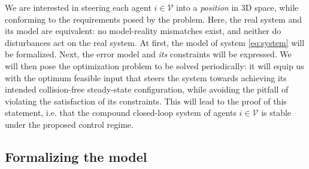 We are interested in steering each agent $i \in \mathcal{V}$ into
a \textit{position} in 3D space, while conforming to the requirements
posed by the problem. Here, the real system and its model are equivalent:
no model-reality mismatches exist, and neither do disturbances act on the real
system. At first, the model of system \eqref{eq:system} will be formalized.
Next, the error model and \textit{its} constraints will be expressed. We will
then pose the optimization problem to be solved periodically: it will equip us
with the optimum feasible input that steers the system towards achieving
its intended collision-free steady-state configuration, while avoiding the
pitfall of violating the satisfaction of its constraints. This will lead to
the proof of this statement, i.e. that the compound closed-loop system of
agents $i \in \mathcal{V}$ is stable under the proposed control regime.


\subsection{Formalizing the model}

